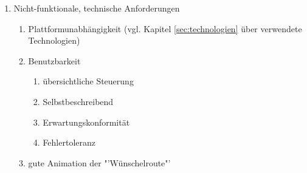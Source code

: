 \begin{enumerate}
\begin{enumerate}
	\end{enumerate}
	\item Nicht-funktionale, technische Anforderungen
	\begin{enumerate}
		\item Plattformunabhängigkeit (vgl. Kapitel \ref{sec:technologien} über verwendete Technologien)
		\item Benutzbarkeit
		\begin{enumerate}
			\item übersichtliche Steuerung
			\item Selbstbeschreibend
			\item Erwartungskonformität
			\item Fehlertoleranz
		\end{enumerate}
		\item gute Animation der "'Wünschelroute"'
	\end{enumerate}
\end{enumerate}

